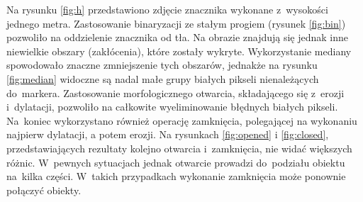 Na rysunku \ref{fig:h} przedstawiono zdjęcie znacznika wykonane z~wysokości jednego metra. 
Zastosowanie binaryzacji ze stałym progiem (rysunek \ref{fig:bin}) pozwoliło na oddzielenie znacznika od tła. %
Na obrazie znajdują się jednak inne niewielkie obszary (zakłócenia), które zostały wykryte. 
Wykorzystanie mediany spowodowało znaczne zmniejszenie tych obszarów, jednakże na rysunku \ref{fig:median} widoczne są nadal małe grupy białych pikseli nienależących do~markera. 
Zastosowanie morfologicznego otwarcia, składającego się z~erozji i~dylatacji,  pozwoliło na całkowite wyeliminowanie błędnych białych pikseli. 
Na~koniec wykorzystano również operację zamknięcia, polegającej na wykonaniu najpierw dylatacji, a potem erozji. 
Na rysunkach \ref{fig:opened} i \ref{fig:closed}, przedstawiających rezultaty kolejno otwarcia i~zamknięcia, nie widać większych różnic. 
W~pewnych sytuacjach jednak otwarcie prowadzi do~podziału obiektu na~kilka części. 
W~takich przypadkach wykonanie zamknięcia może ponownie połączyć obiekty. 



